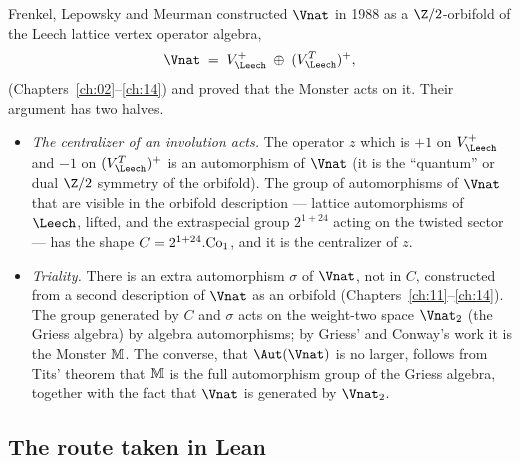 Frenkel, Lepowsky and Meurman constructed $\Vnat$ in 1988 as a $\Z/2$-orbifold of the Leech lattice vertex operator
algebra,
\begin{equation*}
  \Vnat \;=\; V_\Leech^+\;\oplus\;(V_\Leech^T)^+,
\end{equation*}
(Chapters~\ref{ch:02}--\ref{ch:14}) and proved that the Monster acts on it.  Their argument has two halves.
\begin{itemize}
\item \emph{The centralizer of an involution acts.}  The operator $z$ which is $+1$ on $V_\Leech^+$ and $-1$ on
  $(V_\Leech^T)^+$ is an automorphism of $\Vnat$ (it is the ``quantum'' or dual $\Z/2$ symmetry of the orbifold).  The
  group of automorphisms of $\Vnat$ that are visible in the orbifold description --- lattice automorphisms of
  $\Leech$, lifted, and the extraspecial group $2^{1+24}$ acting on the twisted sector --- has the shape
  $C=2^{1+24}.\mathrm{Co}_1$, and it is the centralizer of $z$.
\item \emph{Triality.}  There is an extra automorphism $\sigma$ of $\Vnat$, not in $C$, constructed from a second
  description of $\Vnat$ as an orbifold (Chapters~\ref{ch:11}--\ref{ch:14}).  The group generated by $C$ and $\sigma$
  acts on the weight-two space $\Vnat_2$ (the Griess algebra) by algebra automorphisms; by Griess' and Conway's work
  it is the Monster $\mathbb{M}$.  The converse, that $\Aut(\Vnat)$ is no larger, follows from Tits' theorem that
  $\mathbb{M}$ is the full automorphism group of the Griess algebra, together with the fact that $\Vnat$ is
  generated by $\Vnat_2$.
\end{itemize}

\subsection{The route taken in Lean}

